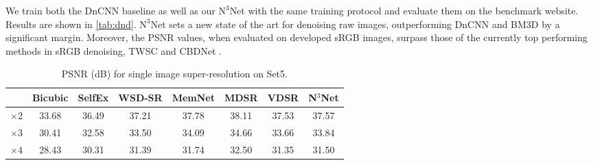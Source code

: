 \documentclass{article}
\newcommand\nnn{\text{N}^3}
\begin{document}
\vspace{-1em}
We train both the DnCNN baseline as well as our $\nnn$Net with the same training protocol and evaluate them on the benchmark website. 
Results are shown in \cref{tab:dnd}.
$\nnn$Net sets a new state of the art for denoising raw images, outperforming DnCNN and BM3D by a significant margin. 
Moreover, the PSNR values, when evaluated on developed sRGB images, surpass those of the currently top performing methods in sRGB denoising, TWSC \cite{Xu:2018:TWSC} and CBDNet \cite{Guo:2018:TCB}.



\begin{table}[b]
	\vspace{-0.5em}
	\caption{PSNR (dB) for single image super-resolution on Set5.}
	\label{tab:superresolution}
	\centering
	\footnotesize
	\smallskip
	\begin{tabularx}{\linewidth}{@{}X S[table-format=2.2] @{\hspace{1.2cm}} S[table-format=2.2] @{\hspace{0.7cm}} S[table-format=2.2] @{\hspace{0.7cm}} S[table-format=2.2] @{\hspace{0.7cm}} S[table-format=2.2] @{\hspace{1.2cm}} S[table-format=2.2] @{\hspace{0.7cm}} S[table-format=2.2]@{}}
		\toprule
						& {Bicubic} 	& {SelfEx}	&  {WSD-SR} 	& {MemNet} 	& {MDSR}	& {VDSR} & {N$^3$Net}	\\
		\midrule
		$\times2$  		& 33.68		& 36.49		& 37.21		& 37.78		& 38.11	& 37.53	&  37.57 \\
		$\times3$  		& 30.41		& 32.58		& 33.50		& 34.09		& 34.66	& 33.66	&  33.84 \\
		$\times4$  		& 28.43		& 30.31		& 31.39		& 31.74		& 32.50	& 31.35	&  31.50 \\

		\bottomrule
	\end{tabularx}
\end{table}
\end{document}

